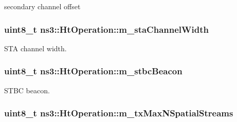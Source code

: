 secondary channel offset 

\subsubsection[{\texorpdfstring{m\+\_\+sta\+Channel\+Width}{m_staChannelWidth}}]{\setlength{\rightskip}{0pt plus 5cm}uint8\+\_\+t ns3\+::\+Ht\+Operation\+::m\+\_\+sta\+Channel\+Width\hspace{0.3cm}{\ttfamily [private]}}\hypertarget{classns3_1_1HtOperation_a62eb3d7e3ee0f1ef68acd2039369f36e}{}\label{classns3_1_1HtOperation_a62eb3d7e3ee0f1ef68acd2039369f36e}


S\+TA channel width. 

\subsubsection[{\texorpdfstring{m\+\_\+stbc\+Beacon}{m_stbcBeacon}}]{\setlength{\rightskip}{0pt plus 5cm}uint8\+\_\+t ns3\+::\+Ht\+Operation\+::m\+\_\+stbc\+Beacon\hspace{0.3cm}{\ttfamily [private]}}\hypertarget{classns3_1_1HtOperation_a31d69de639f2fbc3ab1bdc141ad14277}{}\label{classns3_1_1HtOperation_a31d69de639f2fbc3ab1bdc141ad14277}


S\+T\+BC beacon. 

\subsubsection[{\texorpdfstring{m\+\_\+tx\+Max\+N\+Spatial\+Streams}{m_txMaxNSpatialStreams}}]{\setlength{\rightskip}{0pt plus 5cm}uint8\+\_\+t ns3\+::\+Ht\+Operation\+::m\+\_\+tx\+Max\+N\+Spatial\+Streams\hspace{0.3cm}{\ttfamily [private]}}\hypertarget{classns3_1_1HtOperation_a813210c18935872268f9cece75ae19f1}{}\label{classns3_1_1HtOperation_a813210c18935872268f9cece75ae19f1}


